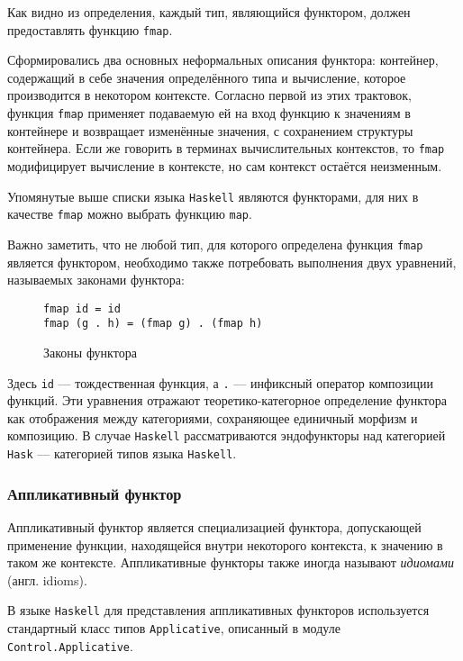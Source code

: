 Как видно из определения, каждый тип, являющийся функтором, должен предоставлять функцию \lstinline{fmap}.

Сформировались два основных неформальных описания функтора: контейнер, содержащий в себе значения определённого типа и вычисление, которое производится в некотором контексте. Согласно первой из этих трактовок, функция \lstinline{fmap} применяет подаваемую ей на вход функцию к значениям в контейнере и возвращает изменённые значения, с сохранением структуры контейнера. Если же говорить в терминах вычислительных контекстов, то \lstinline{fmap} модифицирует вычисление в контексте, но сам контекст остаётся неизменным.

Упомянутые выше списки языка \lstinline{Haskell} являются функторами, для них в качестве \lstinline{fmap} можно выбрать функцию \lstinline{map}. 

Важно заметить, что не любой тип, для которого определена функция \lstinline{fmap} является функтором, необходимо также потребовать выполнения двух уравнений, называемых законами функтора:

\begin{figure}[h]
\begin{lstlisting}
fmap id = id
fmap (g . h) = (fmap g) . (fmap h)
\end{lstlisting}
\caption{Законы функтора}
\label{listing:FunctorLaws}
\end{figure}

Здесь \lstinline{id} --- тождественная функция, а \lstinline{.} --- инфиксный оператор композиции функций. Эти уравнения отражают теоретико-категорное определение функтора как отображения между категориями, сохраняющее единичный морфизм и композицию. В случае \lstinline{Haskell} рассматриваются эндофункторы над категорией \lstinline{Hask} --- категорией типов языка \lstinline{Haskell}.  

\subsubsection{Аппликативный функтор}

Аппликативный функтор является специализацией функтора, допускающей применение функции, находящейся внутри некоторого контекста, к значению в таком же контексте. Аппликативные функторы также иногда называют \emph{идиомами} (англ. idioms).

В языке \lstinline{Haskell} для представления аппликативных функторов используется стандартный класс типов \lstinline{Applicative}, описанный в модуле \lstinline{Control.Applicative}.

